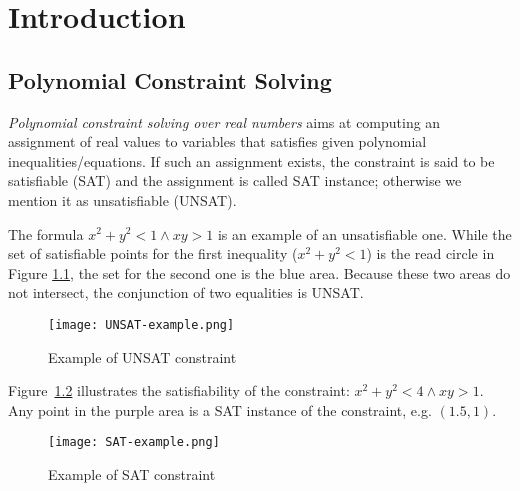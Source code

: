 \chapter{Introduction}
\section{Polynomial Constraint Solving}
{\em Polynomial constraint solving over real numbers} aims at computing an assignment of real values to variables
that satisfies given polynomial inequalities/equations. If such an assignment exists, the constraint is said to be satisfiable (SAT) and the assignment is called SAT instance; otherwise we mention it as unsatisfiable (UNSAT). 
\begin{example} \label{examp:unsat-example}
The formula $x^2 + y^2 < 1 \wedge xy > 1$ is an example of an unsatisfiable one. While the set of satisfiable points for the first inequality ($x^2 + y^2 < 1$) is the read circle in Figure \ref{fig:unsat-example}, the set for the second one is the blue area. Because these two areas do not intersect, the conjunction of two equalities is UNSAT.
\end{example}

\begin{figure}[ht]
\centering
\texttt{[image: UNSAT-example.png]} 
\caption{Example of UNSAT constraint} 
\label{fig:unsat-example} 
\end{figure} 

\begin{example} \label{examp:sat-example}
Figure~\ref{fig:sat-example} illustrates the satisfiability of the constraint: $x^2 + y^2 < 4 \wedge xy > 1$. Any point in the purple area is a SAT instance of the constraint, e.g. $(1.5, 1)$.
\end{example}

\begin{figure}[ht]
\centering
\texttt{[image: SAT-example.png]} 
\caption{Example of SAT constraint} 
\label{fig:sat-example} 
\end{figure} 

